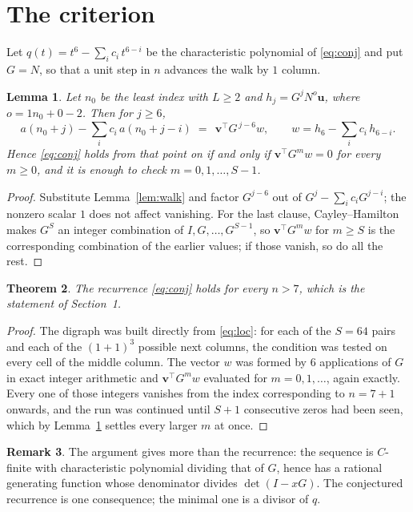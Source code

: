 \documentclass[11pt,a4paper]{article}
\theoremstyle{plain}
\newtheorem{theorem}{Theorem}
\newtheorem{lemma}[theorem]{Lemma}
\theoremstyle{definition}
\newtheorem{remark}[theorem]{Remark}
\begin{document}
\section{The criterion}

Let $q(t)=t^{6}-\sum_i c_i\,t^{6-i}$ be the characteristic polynomial of
\eqref{eq:conj} and put $G=N$, so that a unit step in $n$ advances the walk by
$1$ column.

\begin{lemma}\label{lem:crit}
Let $n_0$ be the least index with $L\ge2$ and $h_j=G^{j}N^{o}\mathbf{u}$, where
$o=1n_0+0-2$. Then for $j\ge6$,
\[
a(n_0+j)-\sum_i c_i\,a(n_0+j-i)\;=\;\,\mathbf{v}^{\!\top}G^{\,j-6}w,
\qquad w=h_{6}-\sum_i c_i\,h_{6-i} .
\]
Hence \eqref{eq:conj} holds from that point on if and only if
$\mathbf{v}^{\!\top}G^{m}w=0$ for every $m\ge0$, and it is enough to check
$m=0,1,\dots,S-1$.
\end{lemma}

\begin{proof}
Substitute Lemma~\ref{lem:walk} and factor $G^{j-6}$ out of
$G^{j}-\sum_ic_iG^{j-i}$; the nonzero scalar $1$ does not affect
vanishing. For the last clause, Cayley--Hamilton makes $G^{S}$ an integer combination of
$I,G,\dots,G^{S-1}$, so $\mathbf{v}^{\!\top}G^{m}w$ for $m\ge S$ is the corresponding
combination of the earlier values; if those vanish, so do all the rest.
\end{proof}

\begin{theorem}
The recurrence \eqref{eq:conj} holds for every $n>7$, which is the statement of
Section~1.
\end{theorem}

\begin{proof}
The digraph was built directly from \eqref{eq:loc}: for each of the $S=64$ pairs and each
of the $(1+1)^{3}$ possible next columns, the condition was tested on every cell of
the middle column. The vector $w$ was formed by $6$ applications of $G$ in exact integer
arithmetic and $\mathbf{v}^{\!\top}G^{m}w$ evaluated for $m=0,1,\dots$, again exactly.
Every one of those integers vanishes from the index corresponding to $n=7+1$ onwards,
and the run was continued until $S+1$ consecutive zeros had been seen, which by
Lemma~\ref{lem:crit} settles every larger $m$ at once.
\end{proof}

\begin{remark}
The argument gives more than the recurrence: the sequence is $C$-finite with characteristic
polynomial dividing that of $G$, hence has a rational generating function whose denominator
divides $\det(I-xG)$. The conjectured recurrence is one consequence; the minimal one is a
divisor of $q$.
\end{remark}
\end{document}
